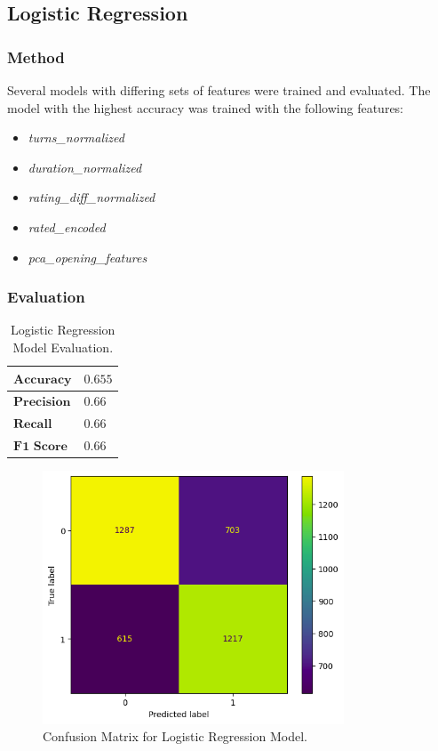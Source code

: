 \documentclass[12pt]{article}
\begin{document}
\subsection{Logistic Regression}

\subsubsection{Method}
Several models with differing sets of features were trained and evaluated. The model with the highest accuracy was trained with the following features:

\begin{itemize}
  \item\textit{turns\_normalized}
  \item\textit{duration\_normalized}
  \item\textit{rating\_diff\_normalized}
  \item\textit{rated\_encoded}
  \item\textit{pca\_opening\_features}
\end{itemize}

\subsubsection{Evaluation}

\begin{table}[H]
\centering
\begin{tabular}{|l|l|}
\hline
$\textbf{Accuracy}$ & $0.655$ \\ \hline
$\textbf{Precision}$ & $0.66$ \\ \hline
$\textbf{Recall}$ & $0.66$ \\ \hline
$\textbf{F1 Score}$ & $0.66$ \\ \hline
\end{tabular}
\caption{Logistic Regression Model Evaluation.}
\label{tab:lr-eval}
\end{table}

\begin{figure}[H]
\centering
\includegraphics[width=0.8\textwidth]{conf-matrix-logit.png}
\caption{Confusion Matrix for Logistic Regression Model.}
\label{fig:conf-matrix-logit}
\end{figure}
\end{document}
